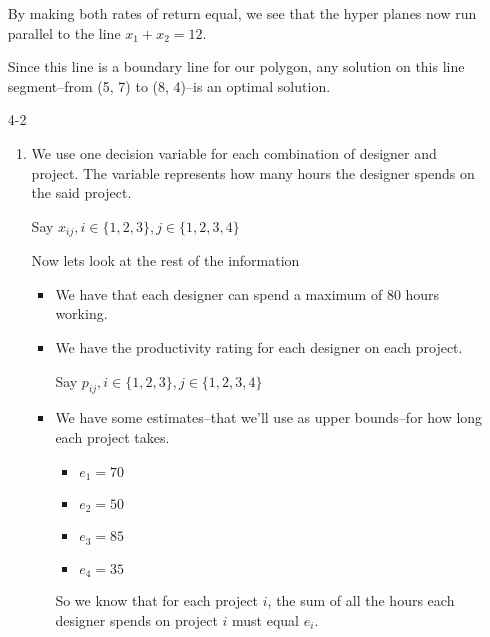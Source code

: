 \documentclass[12pt,letterpaper]{article}
\begin{document}
\begin{enumerate}
\begin{enumerate}
      \end{enumerate}

      By making both rates of return equal,
      we see that the hyper planes now run parallel to the line $x_1 + x_2 = 12$.

      Since this line is a boundary line for our polygon,
      any solution on this line segment--from (5, 7) to (8, 4)--is an optimal solution.

    \item [4-2]
      \begin{enumerate}
        \item
          We use one decision variable for each combination of designer and project.
          The variable represents how many hours the designer spends on the said project.

          Say $x_{ij}, i \in \{1, 2, 3\}, j \in \{1, 2, 3, 4\}$

          Now lets look at the rest of the information

          \begin{itemize}
            \item We have that each designer can spend a maximum of 80 hours working.
            \item
              We have the productivity rating for each designer on each project.

              Say $p_{ij}, i \in \{1, 2, 3\}, j \in \{1, 2, 3, 4\}$
            \item
              We have some estimates--that we'll use as upper bounds--for how long each project takes.
              \begin{itemize}
                \item $e_1 = 70$
                \item $e_2 = 50$
                \item $e_3 = 85$
                \item $e_4 = 35$
              \end{itemize}
              So we know that for each project $i$,
              the sum of all the hours each designer spends on project $i$ must equal $e_i$.
          \end{itemize}


\end{enumerate}
\end{enumerate}
\end{document}

